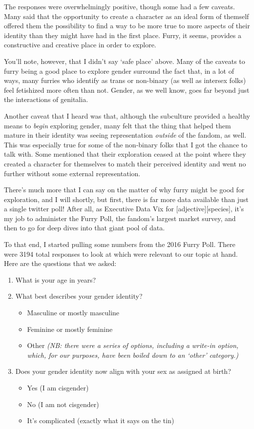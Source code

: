 The responses were overwhelmingly positive, though some had a few caveats. Many said that the opportunity to create a character as an ideal form of themself offered them the possibility to find a way to be more true to more aspects of their identity than they might have had in the first place. Furry, it seems, provides a constructive and creative place in order to explore.

You'll note, however, that I didn't say `safe place' above. Many of the caveats to furry being a good place to explore gender surround the fact that, in a lot of ways, many furries who identify as trans or non-binary (as well as intersex folks) feel fetishized more often than not. Gender, as we well know, goes far beyond just the interactions of genitalia.

Another caveat that I heard was that, although the subculture provided a healthy means to \textit{begin} exploring gender, many felt that the thing that helped them mature in their identity was seeing representation \textit{outside} of the fandom, as well. This was especially true for some of the non-binary folks that I got the chance to talk with. Some mentioned that their exploration ceased at the point where they created a character for themselves to match their perceived identity and went no further without some external representation.

There's much more that I can say on the matter of why furry might be good for exploration, and I will shortly, but first, there is far more data available than just a single twitter poll!  After all, as Executive Data Vix for [adjective][species], it's my job to administer the Furry Poll, the fandom's largest market survey, and then to go for deep dives into that giant pool of data.

To that end, I started pulling some numbers from the 2016 Furry Poll. There were 3194 total responses to look at which were relevant to our topic at hand. Here are the questions that we asked:

\begin{enumerate}
  \item What is your age in years?
  \item What best describes your gender identity?
  \begin{itemize}
    \item Masculine or mostly masculine
    \item Feminine or mostly feminine
    \item Other \textit{(NB: there were a series of options, including a write-in option, which, for our purposes, have been boiled down to an `other' category.)}
  \end{itemize}
  \item Does your gender identity now align with your sex as assigned at birth?
  \begin{itemize}
    \item Yes (I am cisgender)
    \item No (I am not cisgender)
    \item It's complicated (exactly what it says on the tin)
  \end{itemize}
\end{enumerate}

